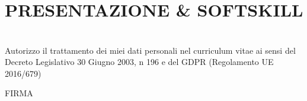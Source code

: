 \documentclass{clean_cv}
\begin{document}
    \section{PRESENTAZIONE \& SOFTSKILL}
        

    \vfill
    \section{}
        Autorizzo il trattamento dei miei dati personali nel curriculum vitae ai sensi del Decreto Legislativo 30 Giugno 2003, n 196 e del GDPR (Regolamento UE 2016/679)
        
        \vspace{2.5cm}
        FIRMA
\end{document}
